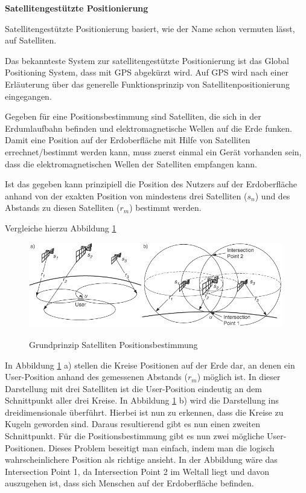\textbf{Satellitengestützte Positionierung}

Satellitengestützte Positionierung basiert, wie der Name schon vermuten lässt, auf Satelliten. 

Das bekannteste System zur satellitengestützte Positionierung ist das Global Positioning System, dass mit GPS abgekürzt wird. Auf GPS wird nach einer Erläuterung über das generelle Funktionsprinzip von Satellitenpositionierung eingegangen.

Gegeben für eine Positionsbestimmung sind Satelliten, die sich in der Erdumlaufbahn befinden und elektromagnetische Wellen auf die Erde funken. Damit eine Position auf der Erdoberfläche mit Hilfe von Satelliten errechnet/bestimmt werden kann, muss zuerst einmal ein Gerät vorhanden sein, dass die elektromagnetischen Wellen der Satelliten empfangen kann.

Ist das gegeben kann prinzipiell die Position des Nutzers auf der Erdoberfläche anhand von der exakten Position von mindestens drei Satelliten ($s_{n}$) und des Abstands zu diesen Satelliten ($r_{m}$) bestimmt werden.

\cite[S. 188]{Schiller2004}

Vergleiche hierzu Abbildung \ref{fig:Grundprinzip Satelliten}

\begin{figure}[h]
\centering
\includegraphics[width=0.99\textwidth]{ref/images/prinzip_satelliten.png}
\caption[Grundprinzip Satelliten Positionsbestimmung]{Grundprinzip Satelliten Positionsbestimmung}
\label{fig:Grundprinzip Satelliten}
\cite[S. 188]{Schiller2004}
\end{figure}

In Abbildung \ref{fig:Grundprinzip Satelliten} a) stellen die Kreise Positionen auf der Erde dar, an denen ein User-Position anhand des gemessenen Abstands ($r_{m}$) möglich ist. In dieser Darstellung mit drei Satelliten ist die User-Position eindeutig an dem Schnittpunkt aller drei Kreise. In Abbildung \ref{fig:Grundprinzip Satelliten} b) wird die Darstellung ins dreidimensionale überführt. Hierbei ist nun zu erkennen, dass die Kreise zu Kugeln geworden sind. Daraus resultierend gibt es nun einen zweiten Schnittpunkt. Für die Positionsbestimmung gibt es nun zwei mögliche User-Positionen. Dieses Problem beseitigt man einfach, indem man die logisch wahrscheinlichere Position als richtige ansieht. In der Abbildung wäre das Intersection Point 1, da Intersection Point 2 im Weltall liegt und davon auszugehen ist, dass sich Menschen auf der Erdoberfläche befinden.

